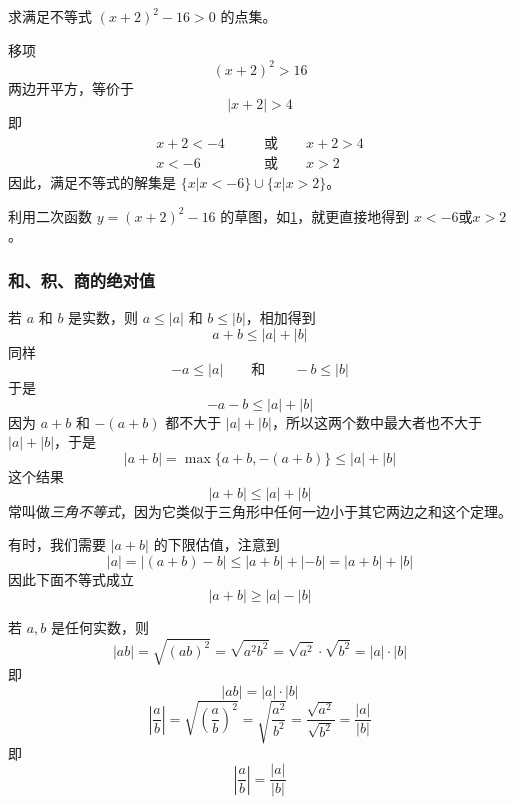\begin{example}
  求满足不等式 $(x+2)^2-16>0$ 的点集。
\end{example}

\begin{solution}
  移项
  \[(x+2)^2>16\]
  两边开平方，等价于
  \[|x+2|>4\]
  即
  \[\begin{split}
        x+2<-4\qquad &\text{或}\qquad x+2>4\\  x<-6\qquad &\text{或}\qquad x>2
  \end{split}\]
因此，满足不等式的解集是 $\{x|x<-6\}\cup\{x|x>2\}$。

利用二次函数 $y=(x+2)^2-16$ 的草图，如\cref{fig:parabolic}，就更直接地得到 $x<-6$或$x>2$。
\begin{figure}
    \caption{}\label{fig:parabolic}
\end{figure}
\end{solution}

\subsubsection{和、积、商的绝对值}
若 $a$ 和 $b$ 是实数，则 $a\leqslant |a|$ 和 $b\leqslant |b|$，相加得到
\[a+b\leqslant  |a|+|b|\]
同样
\[-a\leqslant |a|\qquad \text{和}\qquad -b\leqslant |b|\]
于是
\[-a-b\leqslant |a|+|b|\]
因为 $a+b$ 和 $-(a+b)$ 都不大于 $|a|+|b|$，所以这两个数中最大者也不大于$|a|+|b|$，于是
\[|a+b|=\max\{a+b,-(a+b)\}\leqslant |a|+|b|\]
这个结果
\begin{equation}
    |a+b|\leqslant |a|+|b|
\end{equation}
常叫做\emph{三角不等式}，因为它类似于三角形中任何一边小于其它两边之和这个定理。

有时，我们需要 $|a+b|$ 的下限估值，注意到
\[|a|=|(a+b)-b| \leqslant |a+b| +|-b| =|a+b| +|b|\]
因此下面不等式成立
\begin{equation}
  |a+b|\geqslant |a|-|b|
\end{equation}

若 $a,b$ 是任何实数，则
\[|ab|=\sqrt{(ab)^2}=\sqrt{a^2b^2}=\sqrt{a^2}\cdot \sqrt{b^2}=|a|\cdot |b|\]
即
\begin{equation}
  |ab|=|a|\cdot |b|
\end{equation}
\[\left|\frac{a}{b}\right|=\sqrt{\left(\frac{a}{b}\right)^2}=\sqrt{\frac{a^2}{b^2}}=\frac{\sqrt{a^2}}{\sqrt{b^2}}=\frac{|a|}{|b|}\]
即
\begin{equation}
    \left|\frac{a}{b}\right|=\frac{|a|}{|b|}
\end{equation}


